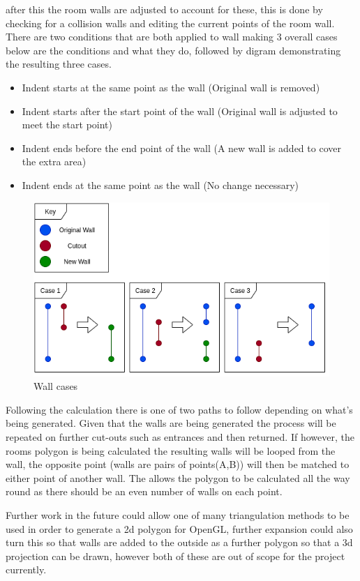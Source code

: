 after this the room walls are adjusted to account for these, this is done by checking for a collision walls and editing the current points of the room wall. There are two conditions that are both applied to wall making 3 overall cases below are the conditions and what they do, followed by digram demonstrating the resulting three cases.
\begin{itemize}
	\item Indent starts at the same point as the wall (Original wall is removed)
	\item Indent starts after the start point of the wall (Original wall is adjusted to meet the start point)
	\item Indent ends before the end point of the wall (A new wall is added to cover the extra area)
	\item Indent ends at the same point as the wall (No change necessary)	
\end{itemize}
\begin{figure}[h]
	\centering
	\includegraphics[width=\linewidth]{images/implementation/wallconditions.png}
	\caption{Wall cases}
	\label{fig:wallcases}
\end{figure}

Following the calculation there is one of two paths to follow depending on what's being generated. Given that the walls are being generated the process will be repeated on further cut-outs such as entrances and then returned. If however, the rooms polygon is being calculated the resulting walls will be looped from the wall, the opposite point (walls are pairs of points(A,B)) will then be matched to either point of another wall. The allows the polygon to be calculated all the way round as there should be an even number of walls on each point.

Further work in the future could allow one of many triangulation methods to be used in order to generate a 2d polygon for OpenGL, further expansion could also turn this so that walls are added to the outside as a further polygon so that a 3d projection can be drawn, however both of these are out of scope for the project currently.


